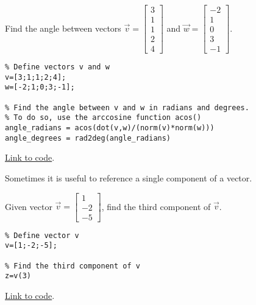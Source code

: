\documentclass{ximera}
\begin{document}
\begin{example}\label{ex:angleInOctave}
    Find the angle between vectors $\vec{v}=\begin{bmatrix}3\\1\\1\\2\\4\end{bmatrix}$ and $\vec{w}=\begin{bmatrix}-2\\1\\0\\3\\-1\end{bmatrix}$.
    \begin{explanation}
        \begin{verbatim}
% Define vectors v and w
v=[3;1;1;2;4];
w=[-2;1;0;3;-1];

% Find the angle between v and w in radians and degrees.  
% To do so, use the arccosine function acos()
angle_radians = acos(dot(v,w)/(norm(v)*norm(w))) 
angle_degrees = rad2deg(angle_radians)
        \end{verbatim}

\href{https://sagecell.sagemath.org/?z=eJxVjsEKgzAMhu9C3yEXoR3Kpu5WvI09wW4yRtdGV9haaGv7-qs6DyOHkJ98X1LCBUdtECLKYJ2HCMIoSKSI_dDxJlfLz3dOitQPdZvHE-943SwJKUq46rwdXpip6Y3wxJAQzW4BbcAJpYXxa6Bwcoh-AW8WlAVvK5g9bgYnpfXLL-NsZNDWgMgBZaRY5Y_d1G-5soHGKrEjNdZ9aGSHtSfGGOzI72BGMtzmif6p2BffHVEJ&lang=octave&interacts=eJyLjgUAARUAuQ==}{Link to code}.        
    \end{explanation}
\end{example}

Sometimes it is useful to reference a single component of a vector.

\begin{example}\label{ex_oct_vec_component}
    Given vector $\vec{v}=\begin{bmatrix}1\\-2\\-5\end{bmatrix}$, find the third component of $\vec{v}$.

\begin{explanation}    
\begin{verbatim}
% Define vector v
v=[1;-2;-5];

% Find the third component of v
z=v(3)
\end{verbatim}

    \href{https://sagecell.sagemath.org/?z=eJxTVXBJTcvMS1UoS00uyS9SKOPlKrONNrTWNbLWNY215uXi5VJVcMvMS1EoyUgF4syiFIXk_NyC_LzUvBKF_DSQhirbMg1jTQAoTxXV&lang=octave&interacts=eJyLjgUAARUAuQ==}{Link to code}.
\end{explanation}    
\end{example}
\end{document}
